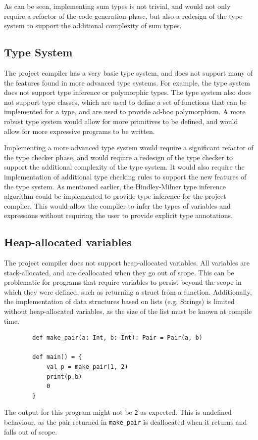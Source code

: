 As can be seen, implementing sum types is not trivial, and would not only require a refactor of the
code generation phase, but also a redesign of the type system to support the additional complexity
of sum types.

\subsection{Type System}

The project compiler has a very basic type system, and does not support many of the features found
in more advanced type systems. For example, the type system does not support type inference or
polymorphic types. The type system also does not support type classes, which are used to define a
set of functions that can be implemented for a type, and are used to provide ad-hoc polymorphism.
A more robust type system would allow for more primitives to be defined, and would allow for more
expressive programs to be written.

Implementing a more advanced type system would require a significant refactor of the type checker
phase, and would require a redesign of the type checker to support the additional complexity of the
type system. It would also require the implementation of additional type checking rules to support
the new features of the type system. As mentioned earlier, the Hindley-Milner type inference
algorithm could be implemented to provide type inference for the project compiler. This would allow
the compiler to infer the types of variables and expressions without requiring the user to provide
explicit type annotations.

\subsection{Heap-allocated variables}

The project compiler does not support heap-allocated variables. All variables are stack-allocated,
and are deallocated when they go out of scope. This can be problematic for programs that require
variables to persist beyond the scope in which they were defined, such as returning a struct from a
function. Additionally, the implementation of data structures based on lists (e.g. Strings) is
limited without heap-allocated variables, as the size of the list must be known at compile time.

\begin{tcolorbox}
    \begin{verbatim}
        def make_pair(a: Int, b: Int): Pair = Pair(a, b)

        def main() = {
            val p = make_pair(1, 2)
            print(p.b)
            0
        }
    \end{verbatim}
    \tcblower
    \footnotesize
    The output for this program might not be \texttt{2} as expected. This is undefined behaviour, as
    the pair returned in \texttt{make\_pair} is deallocated when it returns and falls out of scope.
\end{tcolorbox}

